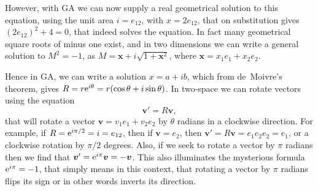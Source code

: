 \documentclass[prb,preprint]{revtex4}
\newcommand{\be}{\begin{equation}}
\newcommand{\ee}{\end{equation}}
\newcommand{\rme}{{\rm{e}}}
\newcommand{\iGAT}{{i}}
\begin{document}
However, with GA we can now supply a real geometrical solution to this equation, using the unit area $ \iGAT = e_{12} $, with $ x = 2 e_{12} $, that on substitution gives $ (2 e_{12})^2 + 4 = 0 $, that indeed solves the equation.  In fact many geometrical square roots of minus one exist, and in two dimensions we can write a general solution to $ M^2 = -1 $, as $ M = \boldsymbol{x} + \iGAT \sqrt{1 + \boldsymbol{x}^2 } $, where $ \boldsymbol{x} = x_1 e_1 + x_2 e_2 $.

Hence in GA, we can write a solution $ x = a + \iGAT b $, which from de~Moivre's theorem, gives $ R = r \rme^{\iGAT \theta } = r (\cos \theta + \iGAT \sin \theta ) $.
In two-space we can rotate vectors using the equation 
\be
 \boldsymbol{v}'= R \boldsymbol{v} ,
\ee
that will rotate a vector $ \boldsymbol{v} =v_1 e_1 + v_2 e_2  $ by $ \theta $ radians in a clockwise direction. For example, if $ R = \rme^{\iGAT \pi/2 } = \iGAT = e_{12} $, then if $ \boldsymbol{v} = e_2 $, then $ \boldsymbol{v}' = R \boldsymbol{v} = e_1 e_2 e_2 = e_1 $, or a clockwise rotation by $ \pi/2 $ degrees.  
Also, if we seek to rotate a vector by $ \pi $ radians then we find that $ \boldsymbol{v}'=  \rme^{ \iGAT \pi } \boldsymbol{v} = -  \boldsymbol{v} $.  This also illuminates the mysterious formula $ \rme^{\iGAT \pi } = -1 $, that simply means in this context, that rotating a vector by $ \pi $ radians flips its sign or in other words inverts its direction.
\end{document}
